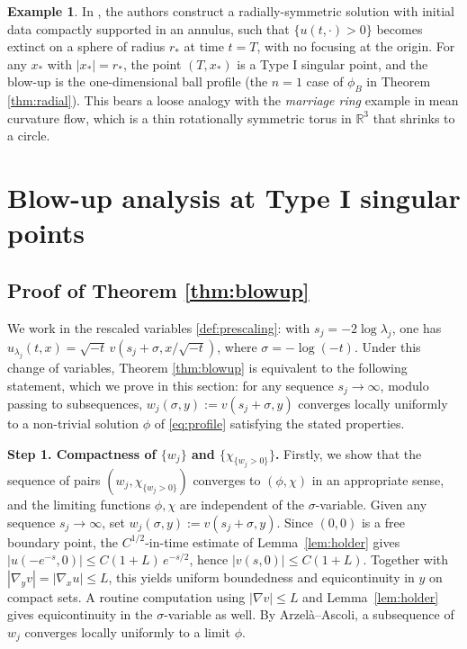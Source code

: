 \documentclass[11pt]{article}
\numberwithin{equation}{section}
\theoremstyle{definition}
\newtheorem{example}{Example}[section]
\begin{document}
\begin{example}\label{eg:extinct-on-sphere}
    In \cite[Theorem 8.2]{radial}, the authors construct a radially-symmetric solution with initial data compactly supported in an annulus, such that $\{u(t,\cdot)>0\}$ becomes extinct on a sphere of radius $r_*$ at time $t=T$, with no focusing at the origin. For any $x_*$ with $|x_*|=r_*$, the point $(T,x_*)$ is a Type I singular point, and the blow-up is the one-dimensional ball profile (the $n=1$ case of $\phi_B$ in Theorem \ref{thm:radial}). This bears a loose analogy with the \emph{marriage ring} example in mean curvature flow, which is a thin rotationally symmetric torus in $\mathbb{R}^3$ that shrinks to a circle.
\end{example}
 

\section{Blow-up analysis at Type I singular points}\label{sec:blowup}

\subsection{Proof of Theorem \ref{thm:blowup}}

We work in the rescaled variables \eqref{def:prescaling}: with $s_j=-2\log\lambda_j$, one has $u_{\lambda_j}(t,x)=\sqrt{-t}\,v(s_j+\sigma,x/\sqrt{-t})$, where $\sigma=-\log(-t)$. Under this change of variables, Theorem \ref{thm:blowup} is equivalent to the following statement, which we prove in this section: for any sequence $s_j\to\infty$, modulo passing to subsequences, $w_j(\sigma,y):=v(s_j+\sigma,y)$ converges locally uniformly to a non-trivial solution $\phi$ of \eqref{eq:profile} satisfying the stated properties.

{\bf Step 1. Compactness of $\{w_j\}$ and $\{\chi_{\{w_j>0\}} \}$.} Firstly, we show that the sequence of pairs $(w_j, \chi_{\{w_j>0\}})$ converges to $(\phi,\chi)$ in an appropriate sense, and the limiting functions $\phi, \chi$ are independent of the $\sigma$-variable.
Given any sequence $s_j\to\infty$, set $w_j(\sigma,y):=v(s_j+\sigma,y)$. Since $(0,0)$ is a free boundary point, the $C^{1/2}$-in-time estimate of Lemma~\ref{lem:holder} gives $|u(-e^{-s},0)|\leq C(1+L)\,e^{-s/2}$, hence $|v(s,0)|\leq C(1+L)$. Together with $|\nabla_y v|=|\nabla_x u|\leq L$, this yields uniform boundedness and equicontinuity in $y$ on compact sets. A routine computation using $|\nabla v|\leq L$ and Lemma~\ref{lem:holder} gives equicontinuity in the $\sigma$-variable as well. By Arzel\`a--Ascoli, a subsequence of $w_j$ converges locally uniformly to a limit $\phi$.
\end{document}
